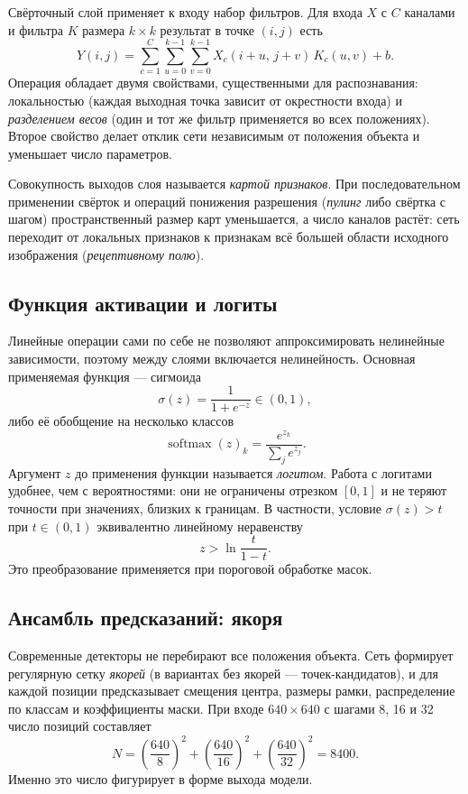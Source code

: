 \documentclass[11pt,a4paper]{article}
\theoremstyle{definition}
\theoremstyle{remark}
\begin{document}
Свёрточный слой применяет к входу набор фильтров. Для входа $X$ с $C$
каналами и фильтра $K$ размера $k \times k$ результат в точке $(i,j)$ есть
\[
  Y(i,j) = \sum_{c=1}^{C} \sum_{u=0}^{k-1} \sum_{v=0}^{k-1}
           X_c(i+u,\, j+v)\, K_c(u,v) + b .
\]
Операция обладает двумя свойствами, существенными для распознавания:
локальностью (каждая выходная точка зависит от окрестности входа) и
\emph{разделением весов} (один и тот же фильтр применяется во всех
положениях). Второе свойство делает отклик сети независимым от положения
объекта и уменьшает число параметров.

Совокупность выходов слоя называется \emph{картой признаков}. При
последовательном применении свёрток и операций понижения разрешения
(\emph{пулинг} либо свёртка с шагом) пространственный размер карт
уменьшается, а число каналов растёт: сеть переходит от локальных признаков к
признакам всё большей области исходного изображения (\emph{рецептивному
полю}).

\subsection{Функция активации и логиты}

Линейные операции сами по себе не позволяют аппроксимировать нелинейные
зависимости, поэтому между слоями включается нелинейность. Основная
применяемая функция --- сигмоида
\[
  \sigma(z) = \frac{1}{1 + e^{-z}} \in (0,1),
\]
либо её обобщение на несколько классов
\[
  \operatorname{softmax}(z)_k = \frac{e^{z_k}}{\sum_j e^{z_j}} .
\]
Аргумент $z$ до применения функции называется \emph{логитом}. Работа с
логитами удобнее, чем с вероятностями: они не ограничены отрезком $[0,1]$ и
не теряют точности при значениях, близких к границам. В частности, условие
$\sigma(z) > t$ при $t \in (0,1)$ эквивалентно линейному неравенству
\[
  z > \ln \frac{t}{1-t} .
\]
Это преобразование применяется при пороговой обработке масок.

\subsection{Ансамбль предсказаний: якоря}

Современные детекторы не перебирают все положения объекта. Сеть формирует
регулярную сетку \emph{якорей} (в вариантах без якорей --- точек-кандидатов),
и для каждой позиции предсказывает смещения центра, размеры рамки,
распределение по классам и коэффициенты маски. При входе $640 \times 640$ с
шагами 8, 16 и 32 число позиций составляет
\[
  N = \left(\frac{640}{8}\right)^2 + \left(\frac{640}{16}\right)^2
    + \left(\frac{640}{32}\right)^2 = 8400 .
\]
Именно это число фигурирует в форме выхода модели.
\end{document}
